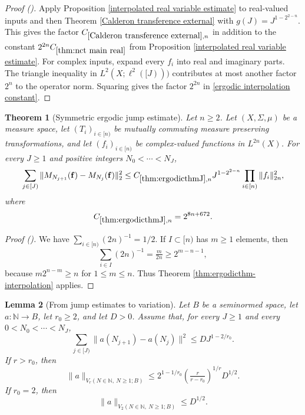 \documentclass[12pt,reqno]{amsart}
\newcommand{\auto}{{({\tiny\faCar})}}
\theoremstyle{plain}
\newtheorem{theorem}{Theorem}[section]
\newtheorem{lemma}[theorem]{Lemma}
\numberwithin{equation}{section}
\theoremstyle{remark}
\newcommand{\uses}[1]{}
\newcommand{\usesdefs}[1]{}
\newcommand{\leanok}{}
\newcommand{\lean}[1]{}
\newcommand{\N}{{\mathbb N}}
\begin{document}
\begin{proof}[Proof \auto]
Apply Proposition \ref{interpolated real variable estimate} to real-valued inputs and then Theorem \ref{Calderon transference external} with $g(J)=J^{1-2^{2-n}}$. This gives the factor $C_{\ref{Calderon transference external},n}$ in addition to the constant $2^{2n}C_{\ref{thm:nct main real}}$ from Proposition \ref{interpolated real variable estimate}. For complex inputs, expand every $f_i$ into real and imaginary parts. The triangle inequality in $L^2(X;\ell^2([J)))$ contributes at most another factor $2^n$ to the operator norm. Squaring gives the factor $2^{2n}$ in \eqref{ergodic interpolation constant}.
\end{proof}

\begin{theorem}[Symmetric ergodic jump estimate]\label{thm:ergodicthmJ}\lean{Auto.symmetric_ergodic_jump_estimate}\leanok\uses{thm:ergodicthm-interpolation}\usesdefs{ergodic averages}
Let $n\ge2$. Let $(X,\Sigma,\mu)$ be a measure space, let $(T_i)_{i\in[n)}$ be mutually commuting measure preserving transformations, and let $(f_i)_{i\in[n)}$ be complex-valued functions in $L^{2n}(X)$. For every $J\ge1$ and positive integers $N_0<\cdots<N_J$,
\begin{equation}\label{symmetric ergodic jump estimate}
\sum_{j\in[J)}\|M_{N_{j+1}}(\mathbf f)-M_{N_j}(\mathbf f)\|_2^2
\le C_{\ref{thm:ergodicthmJ},n}J^{1-2^{2-n}}
\prod_{i\in[n)}\|f_i\|_{2n}^2,
\end{equation}
where
\begin{equation}\label{symmetric ergodic jump constant}
C_{\ref{thm:ergodicthmJ},n}
=2^{8n+672}.
\end{equation}
\end{theorem}

\begin{proof}[Proof \auto]
We have $\sum_{i\in[n)}(2n)^{-1}=1/2$. If $I\subset[n)$ has $m\ge1$ elements, then
\[
\sum_{i\in I}(2n)^{-1}=\tfrac{m}{2n}\ge2^{m-n-1},
\]
because $m2^{n-m}\ge n$ for $1\le m\le n$. Thus Theorem \ref{thm:ergodicthm-interpolation} applies.
\end{proof}

\begin{lemma}[From jump estimates to variation]\label{jump estimates imply variation}\lean{Auto.jump_estimates_imply_variation_enorm,Auto.jump_estimates_imply_variation_endpoint_enorm}\leanok\uses{}\usesdefs{}
Let $B$ be a seminormed space, let $a:\N\to B$, let $r_0\ge2$, and let $D>0$. Assume that, for every $J\ge1$ and every $0<N_0<\cdots<N_J$,
\begin{equation}\label{abstract jump estimate}
\sum_{j\in[J)}\|a(N_{j+1})-a(N_j)\|^2\le D J^{1-2/r_0}.
\end{equation}
If $r>r_0$, then
\begin{equation}\label{abstract variation estimate}
\|a\|_{V_r(N\in\N,\ N\ge1;B)}
\le 2^{1-1/r_0}\left(\tfrac{r}{r-r_0}\right)^{1/r}D^{1/2}.
\end{equation}
If $r_0=2$, then
\begin{equation}\label{abstract endpoint variation estimate}
\|a\|_{V_2(N\in\N,\ N\ge1;B)}\le D^{1/2}.
\end{equation}
\end{lemma}
\end{document}
